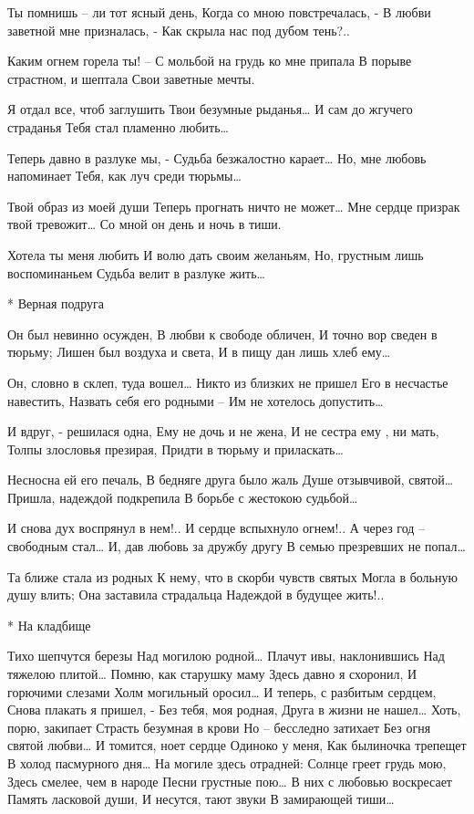 Ты помнишь – ли тот ясный день,
Когда со мною повстречалась, -
В любви заветной мне призналась, -
Как скрыла нас под дубом тень?..

Каким огнем горела ты! –
С мольбой на грудь ко мне припала
В порыве страстном, и шептала
Свои заветные мечты.

Я отдал все, чтоб заглушить
Твои безумные рыданья…
И сам до жгучего страданья
Тебя стал пламенно любить…

Теперь давно в разлуке мы, -
Судьба безжалостно карает…
Но, мне любовь напоминает
Тебя, как луч среди тюрьмы…

Твой образ из моей души
Теперь прогнать ничто не может…
Мне сердце призрак твой тревожит…
Со мной он день и ночь в тиши.

Хотела ты меня любить
И волю дать своим желаньям,
Но, грустным лишь воспоминаньем
Судьба велит в разлуке жить…


* Верная подруга

Он был невинно осужден,
В любви к свободе обличен,
И точно вор сведен в тюрьму;
Лишен был воздуха и света,
И в пищу дан лишь хлеб ему…

Он, словно в склеп, туда вошел…
Никто из близких не пришел
Его в несчастье навестить,
Назвать себя его родными –
Им не хотелось допустить…

И вдруг, - решилася одна,
Ему не дочь и не жена,
И не сестра ему , ни мать,
Толпы злословья презирая,
Придти в тюрьму и приласкать…

Несносна ей его печаль,
В бедняге друга было жаль
Душе отзывчивой, святой…
Пришла, надеждой подкрепила
В борьбе с жестокою судьбой…

И снова дух воспрянул в нем!..
И сердце вспыхнуло огнем!..
А через год – свободным стал…
И, дав любовь за дружбу другу
В семью презревших не попал…

Та ближе стала из родных
К нему, что в скорби чувств святых
Могла в больную душу влить;
Она заставила страдальца
Надеждой в будущее жить!..


* На кладбище

Тихо шепчутся березы
Над могилою родной…
Плачут ивы, наклонившись
Над тяжелою плитой…
Помню, как старушку маму
Здесь давно я схоронил,
И горючими слезами
Холм могильный оросил…
И теперь, с разбитым сердцем,
Снова плакать я пришел, -
Без тебя, моя родная,
Друга в жизни не нашел…
Хоть, порю, закипает
Страсть безумная в крови
Но – бесследно затихает
Без огня святой любви…
И томится, ноет сердце
Одиноко у меня,
Как былиночка трепещет
В холод пасмурного дня…
На могиле здесь отрадней:
Солнце греет грудь мою,
Здесь смелее, чем в народе
Песни грустные пою…
В них с любовью воскресает
Память ласковой души,
И несутся, тают звуки
В замирающей тиши…


